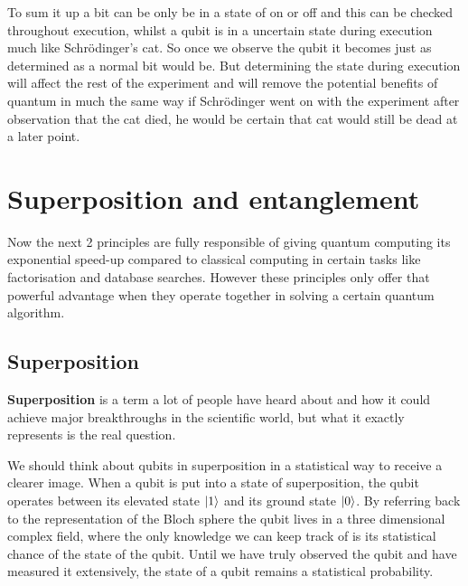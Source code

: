 To sum it up a bit can be only be in a state of on or off and this can be checked throughout execution, whilst a qubit is in a uncertain state during execution much like Schrödinger's cat. So once we observe the qubit it becomes just as determined as a normal bit would be. But determining the state during execution will affect the rest of the experiment and will remove the potential benefits of quantum in much the same way if Schrödinger went on with the experiment after observation that the cat died, he would be certain that cat would still be dead at a later point.

\section{Superposition and entanglement}

Now the next 2 principles are fully responsible of giving quantum computing its exponential speed-up compared to classical computing in certain tasks like factorisation and database searches. However these principles only offer that powerful advantage when they operate together in solving a certain quantum algorithm. 

\subsection{Superposition}
\textbf{Superposition} is a term a lot of people have heard about and how it could achieve major breakthroughs in the scientific world, but what it exactly represents is the real question.

We should think about qubits in superposition in a statistical way to receive a clearer image. When a qubit is put into a state of superposition, the qubit operates between its elevated state $\ket{1}$ and its ground state $\ket{0}$. By referring back to the representation of the Bloch sphere the qubit lives in a three dimensional complex field, where the only knowledge we can keep track of is its statistical chance of the state of the qubit. Until we have truly observed the qubit and have measured it extensively, the state of a qubit remains a statistical probability.


